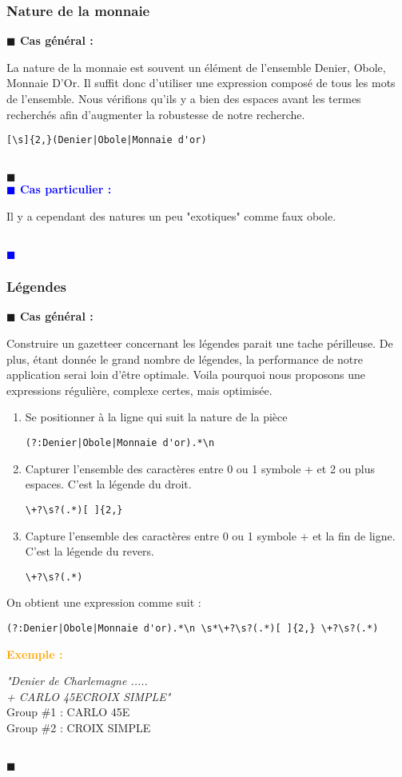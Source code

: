 \documentclass[a4paper, 11pt]{article}
\newenvironment{general}
    {
    \noindent\textbf{\textcolor{dark-blue}{$\blacksquare$  Cas général : \\}}
    }
    {
    ~\\\noindent\textcolor{dark-blue}{$\blacksquare$}\\
    }
\newenvironment{particulier}
    {
    \noindent\textbf{\textcolor{blue}{$\blacksquare$  Cas particulier : \\}}
    }
    {
    \\\noindent\textcolor{blue}{$\blacksquare$}\\
    }
\newenvironment{exemple}
    {
    \noindent\textbf{\textcolor{orange}{
    Exemple : \\}}
    }
    {\\
    }
\begin{document}
\subsubsection{Nature de la monnaie}
\begin{general}
La nature de la monnaie est souvent un élément de l'ensemble {Denier, Obole, Monnaie D'Or}. Il suffit donc d'utiliser une expression composé de tous les mots de l'ensemble. Nous vérifions qu'ils y a bien des espaces avant les termes recherchés afin d'augmenter la robustesse de notre recherche. 
\begin{verbatim}
[\s]{2,}(Denier|Obole|Monnaie d'or)
\end{verbatim}
\end{general}
\begin{particulier}
Il y a cependant des natures un peu "exotiques" comme faux obole.
\end{particulier}
\subsubsection{Légendes}
\begin{general}
Construire un gazetteer concernant les légendes parait une tache périlleuse. De plus, étant donnée le grand nombre de légendes, la performance de notre application serai loin d'être optimale. Voila pourquoi nous proposons une expressions régulière, complexe certes, mais optimisée. \\
\begin{enumerate}
\item Se positionner à la ligne qui suit la nature de la pièce
\begin{verbatim}
(?:Denier|Obole|Monnaie d'or).*\n
\end{verbatim}
\item Capturer l'ensemble des caractères entre 0 ou 1 symbole + et 2 ou plus espaces. C'est la légende du droit.
\begin{verbatim}
\+?\s?(.*)[ ]{2,}
\end{verbatim}
\item Capture l'ensemble des caractères entre 0 ou 1 symbole + et la fin de ligne. C'est la légende du revers.
\begin{verbatim}
\+?\s?(.*)
\end{verbatim}
\end{enumerate}
On obtient une expression comme suit : 
\begin{verbatim}
(?:Denier|Obole|Monnaie d'or).*\n \s*\+?\s?(.*)[ ]{2,} \+?\s?(.*)
\end{verbatim}
\begin{exemple}
\emph{"Denier de Charlemagne ..... \\+ CARLO  45E\indent\indent CROIX SIMPLE"}\\
Group \#1 : CARLO  45E \\
Group \#2 : CROIX SIMPLE
\end{exemple}
\end{general}
\end{document}
